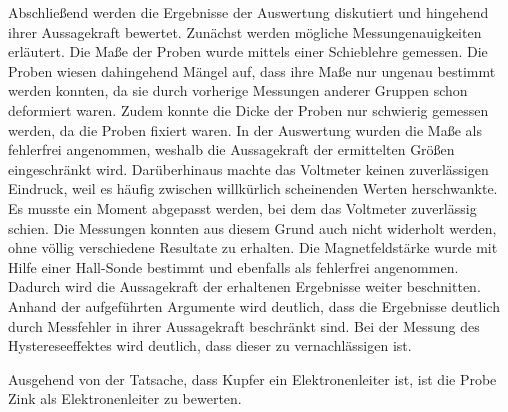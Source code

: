 Abschließend werden die Ergebnisse der Auswertung diskutiert und hingehend ihrer
Aussagekraft bewertet. Zunächst werden mögliche Messungenauigkeiten erläutert.
Die Maße der Proben wurde mittels einer Schieblehre gemessen. Die Proben wiesen
dahingehend Mängel auf, dass ihre Maße nur ungenau bestimmt werden konnten, da sie
durch vorherige Messungen anderer Gruppen schon deformiert waren. Zudem konnte
die Dicke der Proben nur schwierig gemessen werden, da die Proben fixiert waren.
In der Auswertung wurden die Maße als fehlerfrei angenommen, weshalb die Aussagekraft
der ermittelten Größen eingeschränkt wird. Darüberhinaus machte das Voltmeter keinen
zuverlässigen Eindruck, weil es häufig zwischen willkürlich scheinenden Werten
herschwankte. Es musste ein Moment abgepasst werden, bei dem das Voltmeter zuverlässig
schien. Die Messungen konnten aus diesem Grund auch nicht widerholt werden, ohne
völlig verschiedene Resultate zu erhalten. Die Magnetfeldstärke wurde mit Hilfe
einer Hall-Sonde bestimmt und ebenfalls als fehlerfrei angenommen.
Dadurch wird die Aussagekraft der erhaltenen Ergebnisse weiter beschnitten.
Anhand der aufgeführten Argumente wird deutlich, dass die Ergebnisse deutlich
durch Messfehler in ihrer Aussagekraft beschränkt sind. Bei der Messung
des Hystereseeffektes wird deutlich, dass dieser zu vernachlässigen ist.

Ausgehend von der Tatsache, dass Kupfer ein Elektronenleiter ist, ist die
Probe Zink als Elektronenleiter zu bewerten.



